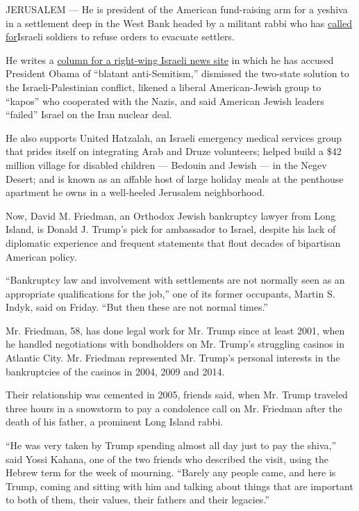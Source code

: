 JERUSALEM --- He is president of the American fund-raising arm for a
yeshiva in a settlement deep in the West Bank headed by a militant rabbi
who has
\href{http://www.israelhayom.com/site/newsletter_article.php?id=230}{called
for}Israeli soldiers to refuse orders to evacuate settlers.

He writes a
\href{http://www.nytimes.com/interactive/2016/12/16/world/middleeast/David-Friedman-Israel-Palestinians-Trump-quotes.html?hp\&action=click\&pgtype=Homepage\&clickSource=story-heading\&module=second-column-region\&region=top-news\&WT.nav=top-news}{column
for a right-wing Israeli news site} in which he has accused President
Obama of ``blatant anti-Semitism,'' dismissed the two-state solution to
the Israeli-Palestinian conflict, likened a liberal American-Jewish
group to ``kapos'' who cooperated with the Nazis, and said American
Jewish leaders ``failed'' Israel on the Iran nuclear deal.

He also supports United Hatzalah, an Israeli emergency medical services
group that prides itself on integrating Arab and Druze volunteers;
helped build a \$42 million village for disabled children --- Bedouin
and Jewish --- in the Negev Desert; and is known as an affable host of
large holiday meals at the penthouse apartment he owns in a well-heeled
Jerusalem neighborhood.

Now, David M. Friedman, an Orthodox Jewish bankruptcy lawyer from Long
Island, is Donald J. Trump's pick for ambassador to Israel, despite his
lack of diplomatic experience and frequent statements that flout decades
of bipartisan American policy.

``Bankruptcy law and involvement with settlements are not normally seen
as an appropriate qualifications for the job,'' one of its former
occupants, Martin S. Indyk, said on Friday. ``But then these are not
normal times.''

Mr. Friedman, 58, has done legal work for Mr. Trump since at least 2001,
when he handled negotiations with bondholders on Mr. Trump's struggling
casinos in Atlantic City. Mr. Friedman represented Mr. Trump's personal
interests in the bankruptcies of the casinos in 2004, 2009 and 2014.

Their relationship was cemented in 2005, friends said, when Mr. Trump
traveled three hours in a snowstorm to pay a condolence call on Mr.
Friedman after the death of his father, a prominent Long Island rabbi.

``He was very taken by Trump spending almost all day just to pay the
shiva,'' said Yossi Kahana, one of the two friends who described the
visit, using the Hebrew term for the week of mourning. ``Barely any
people came, and here is Trump, coming and sitting with him and talking
about things that are important to both of them, their values, their
fathers and their legacies.''

